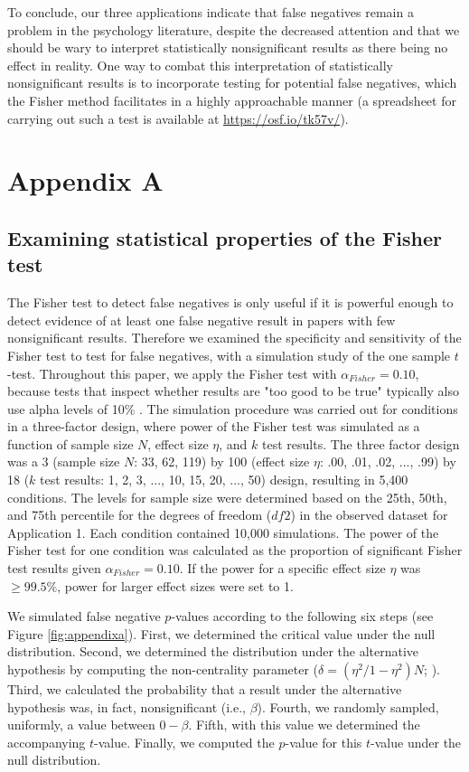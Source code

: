 \documentclass{article}
\begin{document}
To conclude, our three applications indicate that false negatives remain a problem in the psychology literature, despite the decreased attention and that we should be wary to interpret statistically nonsignificant results as there being no effect in reality. One way to combat this interpretation of statistically nonsignificant results is to incorporate testing for potential false negatives, which the Fisher method facilitates in a highly approachable manner (a spreadsheet for carrying out such a test is available at \url{https://osf.io/tk57v/}).

\section*{Appendix A}
\label{apA}
\subsection*{Examining statistical properties of the Fisher test}
The Fisher test to detect false negatives is only useful if it is powerful enough to detect evidence of at least one false negative result in papers with few nonsignificant results. Therefore we examined the specificity and sensitivity of the Fisher test to test for false negatives, with a simulation study of the one sample $t$-test. Throughout this paper, we apply the Fisher test with $\alpha_{Fisher}=0.10$, because tests that inspect whether results are "too good to be true" typically also use alpha levels of 10\% \cite{Sterne2000-wh,Ioannidis2007-hh,Francis2012-kw}. The simulation procedure was carried out for conditions in a three-factor design, where power of the Fisher test was simulated as a function of sample size $N$, effect size $\eta$, and $k$ test results. The three factor design was a 3 (sample size $N$: 33, 62, 119) by 100 (effect size $\eta$: .00, .01, .02, ..., .99) by 18 ($k$ test results: 1, 2, 3, ..., 10, 15, 20, ..., 50) design, resulting in 5,400 conditions. The levels for sample size were determined based on the 25th, 50th, and 75th percentile for the degrees of freedom ($df2$) in the observed dataset for Application 1. Each condition contained 10,000 simulations. The power of the Fisher test for one condition was calculated as the proportion of significant Fisher test results given $\alpha_{Fisher}=0.10$. If the power for a specific effect size $\eta$ was $\geq99.5\%$, power for larger effect sizes were set to 1.

We simulated false negative $p$-values according to the following six steps (see Figure \ref{fig:appendixa}). First, we determined the critical value under the null distribution. Second, we determined the distribution under the alternative hypothesis by computing the non-centrality parameter ($\delta=(\eta^2/1-\eta^2)N$; \cite{Steiger1997-qq,Smithson2001-aw}). Third, we calculated the probability that a result under the alternative hypothesis was, in fact, nonsignificant (i.e., $\beta$). Fourth, we randomly sampled, uniformly, a value between $0-\beta$. Fifth, with this value we determined the accompanying $t$-value. Finally, we computed the $p$-value for this $t$-value under the null distribution. 
\end{document}

